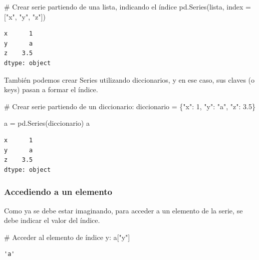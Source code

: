 \documentclass[
  letterpaper,
  DIV=11,
  numbers=noendperiod]{scrreprt}
\newenvironment{Shaded}{\begin{snugshade}}{\end{snugshade}}
\newcommand{\CommentTok}[1]{\textcolor[rgb]{0.37,0.37,0.37}{#1}}
\newcommand{\DecValTok}[1]{\textcolor[rgb]{0.68,0.00,0.00}{#1}}
\newcommand{\FloatTok}[1]{\textcolor[rgb]{0.68,0.00,0.00}{#1}}
\newcommand{\NormalTok}[1]{\textcolor[rgb]{0.00,0.23,0.31}{#1}}
\newcommand{\OperatorTok}[1]{\textcolor[rgb]{0.37,0.37,0.37}{#1}}
\newcommand{\StringTok}[1]{\textcolor[rgb]{0.13,0.47,0.30}{#1}}
\begin{document}
\begin{Shaded}
\begin{Highlighting}[]
\CommentTok{\# Crear serie partiendo de una lista, indicando el índice}
\NormalTok{pd.Series(lista, index }\OperatorTok{=}\NormalTok{ [}\StringTok{"x"}\NormalTok{, }\StringTok{"y"}\NormalTok{, }\StringTok{"z"}\NormalTok{])}
\end{Highlighting}
\end{Shaded}

\begin{verbatim}
x      1
y      a
z    3.5
dtype: object
\end{verbatim}

También podemos crear Series utilizando diccionarios, y en ese caso, sus
claves (o keys) pasan a formar el índice.

\begin{Shaded}
\begin{Highlighting}[]
\CommentTok{\# Crear serie partiendo de un diccionario:}
\NormalTok{diccionario }\OperatorTok{=}\NormalTok{ \{}\StringTok{"x"}\NormalTok{: }\DecValTok{1}\NormalTok{, }\StringTok{"y"}\NormalTok{: }\StringTok{"a"}\NormalTok{, }\StringTok{"z"}\NormalTok{: }\FloatTok{3.5}\NormalTok{\}}

\NormalTok{a }\OperatorTok{=}\NormalTok{ pd.Series(diccionario)}
\NormalTok{a}
\end{Highlighting}
\end{Shaded}

\begin{verbatim}
x      1
y      a
z    3.5
dtype: object
\end{verbatim}

\subsubsection{Accediendo a un elemento}\label{accediendo-a-un-elemento}

Como ya se debe estar imaginando, para acceder a un elemento de la
serie, se debe indicar el valor del índice.

\begin{Shaded}
\begin{Highlighting}[]
\CommentTok{\# Acceder al elemento de índice y:}
\NormalTok{a[}\StringTok{"y"}\NormalTok{]}
\end{Highlighting}
\end{Shaded}

\begin{verbatim}
'a'
\end{verbatim}
\end{document}
